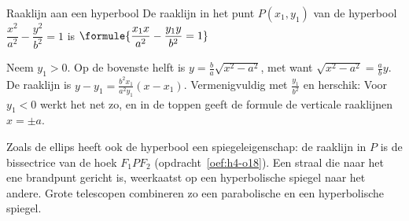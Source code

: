 \begin{theorie}
\begin{stelling}{Raaklijn aan een hyperbool}
De raaklijn in het punt $P(x_1, y_1)$ van de hyperbool $\dfrac{x^2}{a^2} - \dfrac{y^2}{b^2} = 1$ is \qquad $\formule{\dfrac{x_1x}{a^2} - \dfrac{y_1y}{b^2} = 1}$
\end{stelling}

\begin{bewijs}
Neem $y_1 > 0$. Op de bovenste helft is $y = \tfrac ba\sqrt{x^2 - a^2}$, met
want $\sqrt{x^2 - a^2} = \tfrac ab y$. De raaklijn is $y - y_1 = \tfrac{b^2x_1}{a^2y_1}(x - x_1)$. Vermenigvuldig met $\tfrac{y_1}{b^2}$ en herschik:
Voor $y_1 < 0$ werkt het net zo, en in de toppen geeft de formule de verticale raaklijnen $x = \pm a$.
\end{bewijs}
\end{theorie}


Zoals de ellips heeft ook de hyperbool een spiegeleigenschap: de raaklijn in $P$ is de bissectrice van de hoek $F_1PF_2$ (opdracht~\ref{oef:h4-o18}). Een straal die naar het ene brandpunt gericht is, weerkaatst op een hyperbolische spiegel naar het andere. Grote telescopen combineren zo een parabolische en een hyperbolische spiegel.

\begin{oefeningen}
\end{oefeningen}

